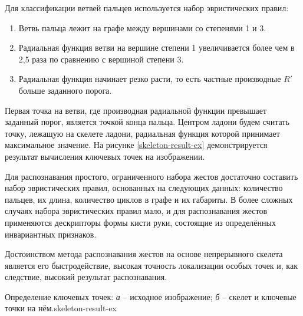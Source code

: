 
Для классификации ветвей пальцев используется набор эвристических 
правил:
\begin{enumerate}
	\item Ветвь пальца лежит на графе между вершинами со степенями
1 и 3.
	\item Радиальная функция ветви на вершине степени 1 увеличивается
более чем в 2,5 раза по сравнению с вершиной степени 3.
	\item Радиальная функция начинает резко расти, то есть частные
производные $R'$ больше заданного порога.
\end{enumerate}

Первая точка на ветви, где производная радиальной функции превышает
заданный порог, является точкой конца пальца. Центром ладони будем
считать точку, лежащую на скелете ладони, радиальная функция
которой принимает максимальное значение. На рисунке 
\ref{skeleton-result-ex} демонстрируется результат вычисления
ключевых точек на изображении.

Для распознавания простого, ограниченного набора жестов достаточно
составить набор эвристических правил, основанных на следующих
данных: количество пальцев, их длина, количество циклов в графе и их 
габариты. В более сложных случаях набора эвристических правил мало, и
для распознавания жестов применяются дескрипторы формы кисти руки,
состоящие из определённых инвариантных признаков.

Достоинством метода распознавания жестов на основе непрерывного
скелета является его быстродействие, высокая точность локализации
особых точек и, как следствие, высокий результат распознавания. 

{Определение ключевых точек: {\it а} -- исходное изображение;
{\it б} -- скелет и ключевые точки на нём.}{skeleton-result-ex}
